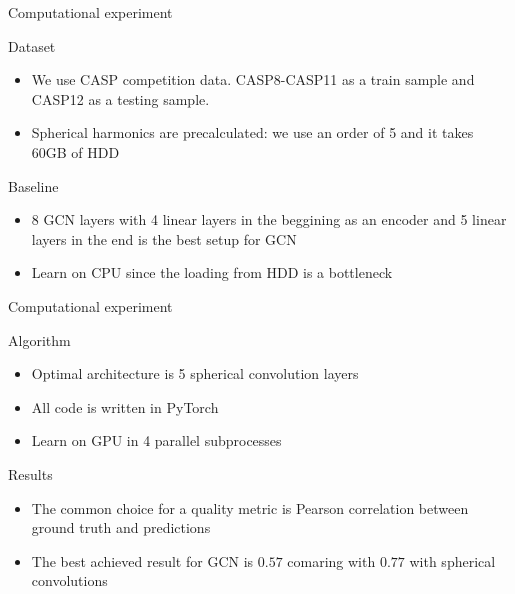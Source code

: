\documentclass{beamer}
\begin{document}
\begin{frame}{Computational experiment}
    \begin{block}{Dataset}
        \begin{itemize}
            \item We use CASP competition data. CASP8-CASP11 as a train sample and CASP12 as a testing sample.
            \item Spherical harmonics are precalculated: we use an order of 5 and it takes 60GB of HDD
        \end{itemize}
    \end{block}
    \begin{block}{Baseline}
        \begin{itemize}
            \item 8 GCN layers with 4 linear layers in the beggining as an encoder and 5 linear layers in the end is the best setup for GCN
            \item Learn on CPU since the loading from HDD is a bottleneck
        \end{itemize}
    \end{block}
    
    
\end{frame}
\begin{frame}{Computational experiment}
    \begin{block}{Algorithm}
        \begin{itemize}
            \item Optimal architecture is 5 spherical convolution layers
            \item All code is written in PyTorch
            \item Learn on GPU in 4 parallel subprocesses
        \end{itemize}
    \end{block}
    \begin{block}{Results}
        \begin{itemize}
            \item The common choice for a quality metric is Pearson correlation between ground truth and predictions
            \item The best achieved result for GCN is $0.57$ comaring with $0.77$ with spherical convolutions
        \end{itemize}
    \end{block}
\end{frame}
\end{document}
